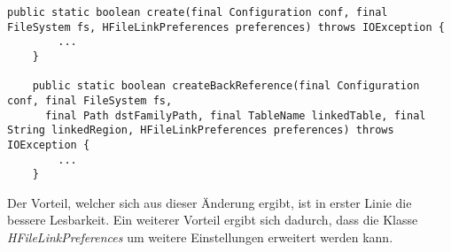 \begin{lstlisting}[language={[Sharp]C}, caption=Beispiele für Rückgabe eines Null Wertes, label=lst:TriadischFunction]
   public static boolean create(final Configuration conf, final FileSystem fs, HFileLinkPreferences preferences) throws IOException {
		...
	}
	
	public static boolean createBackReference(final Configuration conf, final FileSystem fs,
      final Path dstFamilyPath, final TableName linkedTable, final String linkedRegion, HFileLinkPreferences preferences) throws IOException {
		...
	}
\end{lstlisting}

\SuperPar Der Vorteil, welcher sich aus dieser Änderung ergibt, ist in erster Linie die bessere Lesbarkeit. Ein weiterer Vorteil ergibt sich dadurch, dass die Klasse \textit{HFileLinkPreferences} um weitere Einstellungen erweitert werden kann. 
